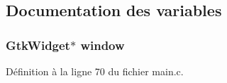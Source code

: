 \subsection{Documentation des variables}
\subsubsection[{window}]{\setlength{\rightskip}{0pt plus 5cm}GtkWidget$\ast$ {\bf window}}\label{gsb__archive__config_8c_a3d346c08cf2d67c388caabffb412b293}


Définition à la ligne 70 du fichier main.c.

